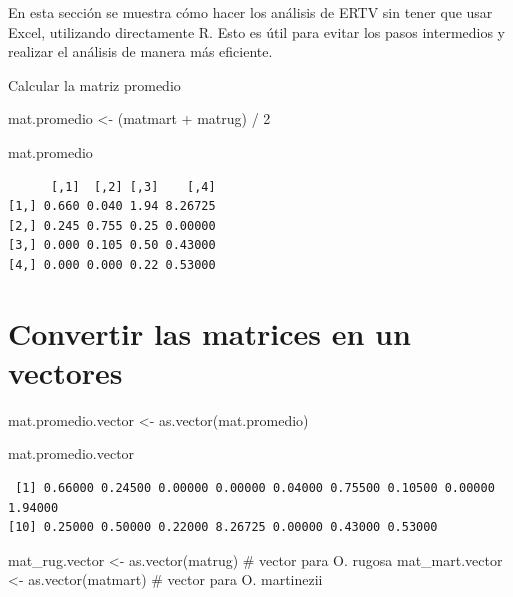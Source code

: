 \documentclass[
  12pt,
  letterpaper,
]{book}
\newenvironment{Shaded}{\begin{snugshade}}{\end{snugshade}}
\newcommand{\CommentTok}[1]{\textcolor[rgb]{0.37,0.37,0.37}{#1}}
\newcommand{\DecValTok}[1]{\textcolor[rgb]{0.68,0.00,0.00}{#1}}
\newcommand{\FunctionTok}[1]{\textcolor[rgb]{0.28,0.35,0.67}{#1}}
\newcommand{\NormalTok}[1]{\textcolor[rgb]{0.00,0.23,0.31}{#1}}
\newcommand{\OtherTok}[1]{\textcolor[rgb]{0.00,0.23,0.31}{#1}}
\newcommand{\SpecialCharTok}[1]{\textcolor[rgb]{0.37,0.37,0.37}{#1}}
\begin{document}
En esta sección se muestra cómo hacer los análisis de ERTV sin tener que
usar Excel, utilizando directamente R. Esto es útil para evitar los
pasos intermedios y realizar el análisis de manera más eficiente.

Calcular la matriz promedio

\begin{Shaded}
\begin{Highlighting}[]
\NormalTok{mat.promedio }\OtherTok{\textless{}{-}}\NormalTok{ (matmart }\SpecialCharTok{+}\NormalTok{ matrug) }\SpecialCharTok{/} \DecValTok{2}

\NormalTok{mat.promedio}
\end{Highlighting}
\end{Shaded}

\begin{verbatim}
      [,1]  [,2] [,3]    [,4]
[1,] 0.660 0.040 1.94 8.26725
[2,] 0.245 0.755 0.25 0.00000
[3,] 0.000 0.105 0.50 0.43000
[4,] 0.000 0.000 0.22 0.53000
\end{verbatim}

\section{Convertir las matrices en un
vectores}\label{convertir-las-matrices-en-un-vectores}

\begin{Shaded}
\begin{Highlighting}[]
\NormalTok{mat.promedio.vector }\OtherTok{\textless{}{-}} \FunctionTok{as.vector}\NormalTok{(mat.promedio)}

\NormalTok{mat.promedio.vector}
\end{Highlighting}
\end{Shaded}

\begin{verbatim}
 [1] 0.66000 0.24500 0.00000 0.00000 0.04000 0.75500 0.10500 0.00000 1.94000
[10] 0.25000 0.50000 0.22000 8.26725 0.00000 0.43000 0.53000
\end{verbatim}

\begin{Shaded}
\begin{Highlighting}[]
\NormalTok{mat\_rug.vector }\OtherTok{\textless{}{-}} \FunctionTok{as.vector}\NormalTok{(matrug) }\CommentTok{\# vector para O. rugosa}
\NormalTok{mat\_mart.vector }\OtherTok{\textless{}{-}} \FunctionTok{as.vector}\NormalTok{(matmart) }\CommentTok{\# vector para O. martinezii}
\end{Highlighting}
\end{Shaded}
\end{document}
